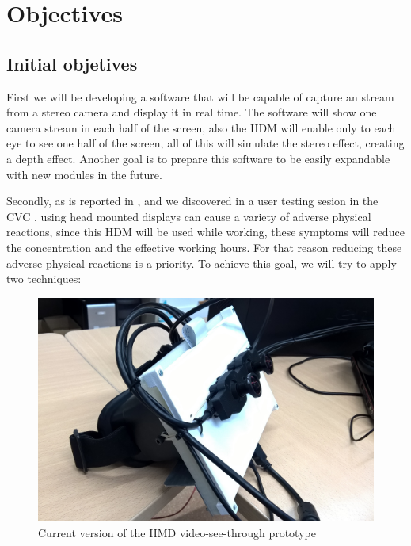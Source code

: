 \documentclass[10pt,a4paper,twocolumn,twoside]{article}
\begin{document}
	
	\section{Objectives}
	
	\subsection{Initial objetives}
	First we will be developing a software that will be capable of capture an stream from a stereo camera and display it in real time. The software will show one camera stream in each half of the screen, also the HDM will enable only to each eye to see one half of the screen, all of this will simulate the stereo effect, creating a depth effect. Another goal is to prepare this software to be easily expandable with new modules in the future.
	
	Secondly, as is reported in \cite{disconfortReview}, and we discovered in a user testing sesion in the CVC \cite{unpublishCVC}, using head mounted displays can cause a variety of adverse physical reactions, since this HDM will be used while working, these symptoms will reduce the concentration and the effective working hours. For that reason reducing these adverse physical reactions is a priority. To achieve this goal, we will try to apply two techniques: 
	
	\begin{figure}
		\centering
		\includegraphics[width=0.7\linewidth]{img/231.jpg}
		\caption{Current version of the HMD video-see-through prototype}
		\label{fig:proto}
	\end{figure}
	
\end{document}
